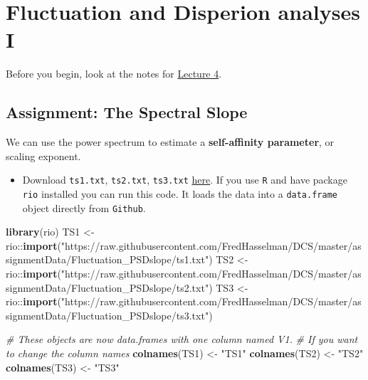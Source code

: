 \documentclass[]{book}
\newenvironment{Shaded}{\begin{snugshade}}{\end{snugshade}}
\newcommand{\KeywordTok}[1]{\textcolor[rgb]{0.13,0.29,0.53}{\textbf{{#1}}}}
\newcommand{\StringTok}[1]{\textcolor[rgb]{0.31,0.60,0.02}{{#1}}}
\newcommand{\CommentTok}[1]{\textcolor[rgb]{0.56,0.35,0.01}{\textit{{#1}}}}
\newcommand{\NormalTok}[1]{{#1}}
\providecommand{\tightlist}{%
  \setlength{\itemsep}{0pt}\setlength{\parskip}{0pt}}
\let\stdsection\section
\renewcommand\section{\newpage\stdsection}
\let\BeginKnitrBlock\begin \let\EndKnitrBlock\end
\begin{document}
\chapter{\texorpdfstring{\textbf{Fluctuation and Disperion analyses
I}}{Fluctuation and Disperion analyses I}}\label{fda1}

\BeginKnitrBlock{rmdimportant}
Before you begin, look at the notes for
\protect\hyperlink{lecture-4}{Lecture 4}.
\EndKnitrBlock{rmdimportant}

\hypertarget{psd}{\section{Assignment: The Spectral Slope}\label{psd}}

We can use the power spectrum to estimate a \textbf{self-affinity
parameter}, or scaling exponent.

\begin{itemize}
\tightlist
\item
  Download \texttt{ts1.txt}, \texttt{ts2.txt}, \texttt{ts3.txt}
  \href{https://github.com/FredHasselman/DCS/tree/master/assignmentData/Fluctuation_PSDslope}{here}.
  If you use \texttt{R} and have package \texttt{rio} installed you can
  run this code. It loads the data into a \texttt{data.frame} object
  directly from \texttt{Github}.
\end{itemize}

\begin{Shaded}
\begin{Highlighting}[]
\KeywordTok{library}\NormalTok{(rio)}
\NormalTok{TS1 <-}\StringTok{ }\NormalTok{rio::}\KeywordTok{import}\NormalTok{(}\StringTok{"https://raw.githubusercontent.com/FredHasselman/DCS/master/assignmentData/Fluctuation_PSDslope/ts1.txt"}\NormalTok{)}
\NormalTok{TS2 <-}\StringTok{ }\NormalTok{rio::}\KeywordTok{import}\NormalTok{(}\StringTok{"https://raw.githubusercontent.com/FredHasselman/DCS/master/assignmentData/Fluctuation_PSDslope/ts2.txt"}\NormalTok{)}
\NormalTok{TS3 <-}\StringTok{ }\NormalTok{rio::}\KeywordTok{import}\NormalTok{(}\StringTok{"https://raw.githubusercontent.com/FredHasselman/DCS/master/assignmentData/Fluctuation_PSDslope/ts3.txt"}\NormalTok{)}

\CommentTok{# These objects are now data.frames with one column named V1. }
\CommentTok{# If you want to change the column names}
\KeywordTok{colnames}\NormalTok{(TS1) <-}\StringTok{ "TS1"}
\KeywordTok{colnames}\NormalTok{(TS2) <-}\StringTok{ "TS2"}
\KeywordTok{colnames}\NormalTok{(TS3) <-}\StringTok{ "TS3"}
\end{Highlighting}
\end{Shaded}
\end{document}
